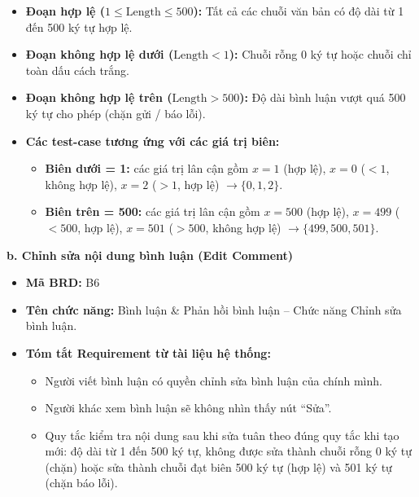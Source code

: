 \documentclass[11pt,a4paper]{article}
\begin{document}
\begin{itemize}[leftmargin=1.2cm, noitemsep]
    \item[\textbf{--}] \textbf{Đoạn hợp lệ ($1 \le \text{Length} \le 500$):} Tất cả các chuỗi văn bản có độ dài từ 1 đến 500 ký tự hợp lệ.
    \item[\textbf{--}] \textbf{Đoạn không hợp lệ dưới ($\text{Length} < 1$):} Chuỗi rỗng 0 ký tự hoặc chuỗi chỉ toàn dấu cách trắng.
    \item[\textbf{--}] \textbf{Đoạn không hợp lệ trên ($\text{Length} > 500$):} Độ dài bình luận vượt quá 500 ký tự cho phép (chặn gửi / báo lỗi).
    \item[\textbf{--}] \textbf{Các test-case tương ứng với các giá trị biên:}
    \begin{itemize}[leftmargin=0.8cm, label=$\bullet$, noitemsep]
        \item \textbf{Biên dưới = 1:} các giá trị lân cận gồm $x = 1$ (hợp lệ), $x = 0$ ($<1$, không hợp lệ), $x = 2$ ($>1$, hợp lệ) $\rightarrow \{0, 1, 2\}$.
        \item \textbf{Biên trên = 500:} các giá trị lân cận gồm $x = 500$ (hợp lệ), $x = 499$ ($<500$, hợp lệ), $x = 501$ ($>500$, không hợp lệ) $\rightarrow \{499, 500, 501\}$.
    \end{itemize}
\end{itemize}


\noindent\textbf{b. Chỉnh sửa nội dung bình luận (Edit Comment)}
\begin{itemize}[leftmargin=1.2cm, noitemsep]
    \item[\textbf{--}] \textbf{Mã BRD:} B6
    \item[\textbf{--}] \textbf{Tên chức năng:} Bình luận \& Phản hồi bình luận -- Chức năng Chỉnh sửa bình luận.
    \item[\textbf{--}] \textbf{Tóm tắt Requirement từ tài liệu hệ thống:}
    \begin{itemize}[leftmargin=0.8cm, label=$\bullet$, noitemsep]
        \item Người viết bình luận có quyền chỉnh sửa bình luận của chính mình.
        \item Người khác xem bình luận sẽ không nhìn thấy nút ``Sửa''.
        \item Quy tắc kiểm tra nội dung sau khi sửa tuân theo đúng quy tắc khi tạo mới: độ dài từ 1 đến 500 ký tự, không được sửa thành chuỗi rỗng 0 ký tự (chặn) hoặc sửa thành chuỗi đạt biên 500 ký tự (hợp lệ) và 501 ký tự (chặn báo lỗi).
    \end{itemize}
\end{itemize}
\end{document}
